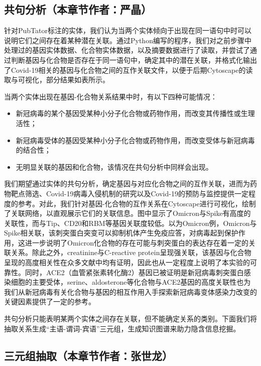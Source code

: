 \documentclass[twocolumn]{article}
\begin{document}
\subsection{共句分析（本章节作者：严晶）\label{chap:cosentence}}
针对PubTator标注的实体，我们认为当两个实体倾向于出现在同一语句中时可以说明它们之间存在着某种潜在关联。通过Python编写的程序，我们对之前步骤中处理过的基因实体数据、化合物实体数据，以及摘要数据进行了读取，并尝试了通过判断基因与化合物是否存在于同一语句中，确定其中的潜在关联，并格式化输出了Covid-19相关的基因与化合物之间的互作关联文件，以便于后期Cytoscape的读取与可视化，部分结果如表所示。\par
当两个实体出现在基因-化合物关系结果中时，有以下四种可能情况：
\begin{itemize}
	\item 新冠病毒的某个基因受某种小分子化合物或药物作用，而改变其传播性或生理活性；
	\item 新冠病毒受体的基因受某种小分子化合物或药物作用，而改变受体与新冠病毒的结合性；
	\item 无明显关联的基因和化合物，该情况在共句分析中同样会出现。
\end{itemize}

我们期望通过实体的共句分析，确定基因与对应化合物之间的互作关联，进而为药物靶点筛选、Covid-19病毒入侵机制的研究以及Covid-19的预防与监控提供一定程度的参考。对此，我们针对基因-化合物的互作关系在Cytoscape进行可视化，绘制了关联网络，以直观展示它们的关联信息。图中显示了Omicron与Spike有高度的关联性，而与Tip、CD20和RBM等基因关联度较低。以为Omicron例，Omicron与Spike相关联，该刺突蛋白突变可以抑制机体产生免疫应答，对病毒起到保护作用\cite{spike}，这进一步说明了Omicron化合物的存在可能与刺突蛋白的表达存在着一定的关联关系。除此之外，creatinine与C-reactive protein呈现强关联，该基因与化合物呈现的高度相关性在众多文献中均有证明，因此也从一定程度上说明了本实验的可靠性。同时，ACE2（血管紧张素转化酶2）基因已被证明是新冠病毒刺突蛋白感染细胞的主要受体，serine、aldosterone等化合物与ACE2基因的高度关联性也为我们从新冠病毒有关化合物与基因的相互作用入手探索新冠病毒变体感染力改变的关键因素提供了一定的参考。\par
共句分析只能表明某两个实体之间存在关联，但不能确定关系的类别。下面我们将抽取关系生成“主语-谓词-宾语”三元组，生成知识图谱来助力隐含信息挖掘。\par

\subsection{三元组抽取（本章节作者：张世龙）\label{chap:triple}}
\end{document}
